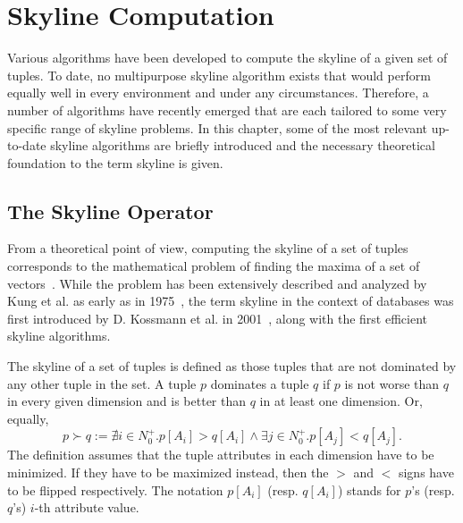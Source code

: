 \chapter{Skyline Computation} \label{chapter:skyline-computation}
Various algorithms have been developed to compute the skyline of a given set of tuples. To date, no multipurpose skyline algorithm exists that would perform equally well in every environment and under any circumstances. Therefore, a number of algorithms have recently emerged that are each tailored to some very specific range of skyline problems. In this chapter, some of the most relevant up-to-date skyline algorithms are briefly introduced and the necessary theoretical foundation to the term skyline is given. 

\section{The Skyline Operator} \label{section:skyline-operator}
From a theoretical point of view, computing the skyline of a set of tuples corresponds to the mathematical problem of finding the maxima of a set of vectors~\cite{kung}. While the problem has been extensively described and analyzed by Kung et al. as early as in 1975~\cite{kung}, the term skyline in the context of databases was first introduced by D. Kossmann et al. in 2001~\cite{kossmann}, along with the first efficient skyline algorithms. 

The skyline of a set of tuples is defined as those tuples that are not dominated by any other tuple in the set. A tuple $p$ dominates a tuple $q$ if $p$ is not worse than $q$ in every given dimension and is better than $q$ in at least one dimension. Or, equally, 
\begin{equation}
p \succ q := \nexists i \in N^{+}_{0} . p[A_{i}] > q[A_{i}] \wedge \exists j \in N^{+}_{0} . p[A_{j}] < q[A_{j}]. 
\end{equation}
The definition assumes that the tuple attributes in each dimension have to be minimized. If they have to be maximized instead, then the $>$ and $<$ signs have to be flipped respectively. The notation $p[A_{i}]$ (resp. $q[A_{i}]$) stands for $p$'s (resp. $q$'s) $i$-th attribute value. 





